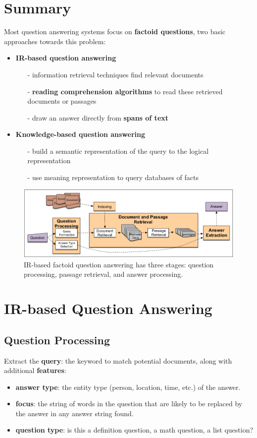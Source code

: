 \documentclass[a4paper, 12pt]{book} %
\begin{document}
\section{Summary}
Most question answering systems focus on \textbf{factoid questions}, two basic approaches towards this problem:
\begin{itemize}
	\item \textbf{IR-based question answering}
	\begin{itemize}
		\item[-] information retrieval techniques find relevant documents
		\item[-] \textbf{reading comprehension algorithms} to read these retrieved documents or passages
		\item[-] draw an answer directly from \textbf{spans of text}
	\end{itemize}
	\item \textbf{Knowledge-based question answering}
	\begin{itemize}
		\item[-] build a semantic representation of the query to the logical representation
		\item[-] use meaning representation to query databases of facts
	\end{itemize}
\end{itemize}

\begin{figure}[htpb]
	\centering
	\includegraphics[width=\linewidth]{figures/ir_qa_overview.png}
	\caption{IR-based factoid question answering has three stages: question processing, passage retrieval, and
		answer processing.}
	\label{fig:boat1}
\end{figure}

\section{IR-based Question Answering}
\subsection{Question Processing}
Extract the \textbf{query}: the keyword to match potential documents, along with additional \textbf{features}:
\begin{itemize}
	\item \textbf{answer type}: the entity type (person, location, time, etc.) of the answer.
	\item \textbf{focus}: the string of words in the question that are likely to be replaced by the answer in any answer string found.
	\item \textbf{question type}: is this a definition question, a math question, a list question?
\end{itemize}
\end{document}
